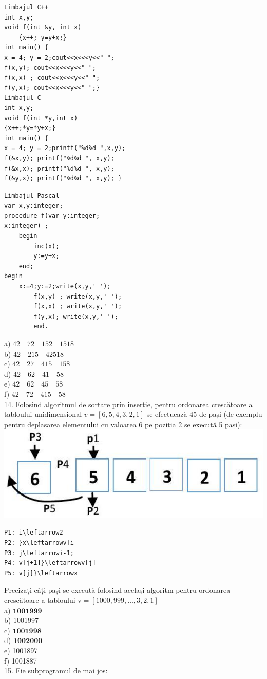 \documentclass[10pt]{article}
\begin{document}
\begin{verbatim}
Limbajul C++
int x,y;
void f(int &y, int x)
    {x++; y=y+x;}
int main() {
x = 4; y = 2;cout<<x<<<y<<" ";
f(x,y); cout<<x<<<y<<" ";
f(x,x) ; cout<<x<<<y<<" ";
f(y,x); cout<<x<<<y<<" ";}
Limbajul C
int x,y;
void f(int *y,int x)
{x++;*y=*y+x;}
int main() {
x = 4; y = 2;printf("%d%d ",x,y);
f(&x,y); printf("%d%d ", x,y);
f(&x,x); printf("%d%d ", x,y);
f(&y,x); printf("%d%d ", x,y); }
\end{verbatim}

\begin{verbatim}
Limbajul Pascal
var x,y:integer;
procedure f(var y:integer;
x:integer) ;
    begin
        inc(x);
        y:=y+x;
    end;
begin
    x:=4;y:=2;write(x,y,' ');
        f(x,y) ; write(x,y,' ');
        f(x,x) ; write(x,y,' ');
        f(y,x); write(x,y,' ');
        end.
\end{verbatim}

a) $42 \quad 72 \quad 152 \quad 1518$\\
b) $42 \quad 215 \quad 42518$\\
c) $42 \quad 27 \quad 415 \quad 158$\\
d) $42 \quad 62 \quad 41 \quad 58$\\
e) $42 \quad 62 \quad 45 \quad 58$\\
f) $42 \quad 72 \quad 415 \quad 58$\\
14. Folosind algoritmul de sortare prin inserție, pentru ordonarea crescătoare a tabloului unidimensional $v=[6,5,4,3,2,1]$ se efectuează 45 de pași (de exemplu pentru deplasarea elementului cu valoarea 6 pe poziția 2 se execută 5 pași):\\
\includegraphics[max width=\textwidth, center]{2025_04_17_46e04c6acd873ea9558dg-103}

\begin{verbatim}
P1: i\leftarrow2
P2: }x\leftarrowv[i
P3: j\leftarrowi-1;
P4: v[j+1]}\leftarrowv[j]
P5: v[j]}\leftarrowx
\end{verbatim}

Precizați câți pași se execută folosind același algoritm pentru ordonarea crescătoare a tabloului $\mathrm{v}=[1000,999, \ldots, 3,2,1]$\\
a) $\mathbf{1 0 0 1 9 9 9}$\\
b) 1001997\\
c) $\mathbf{1 0 0 1 9 9 8}$\\
d) $\mathbf{1 0 0 2 0 0 0}$\\
e) 1001897\\
f) 1001887\\
15. Fie subprogramul de mai jos:
\end{document}
